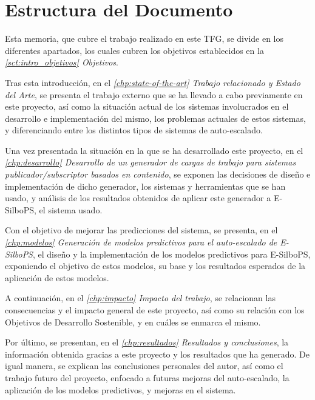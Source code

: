 
\section{Estructura del Documento} \label{sct:intro_estructura}

Esta memoria, que cubre el trabajo realizado en este TFG, se divide en los 
diferentes apartados, los cuales cubren los objetivos establecidos en la 
\textit{\autoref{sct:intro_objetivos} Objetivos}.

Tras esta introducción, en el \textit{\autoref{chp:state-of-the-art} Trabajo relacionado y Estado 
del Arte}, se presenta el trabajo externo que se ha llevado a cabo previamente 
en este proyecto, así como la situación actual de los sistemas involucrados en el 
desarrollo e implementación del mismo, los problemas actuales de estos sistemas, y
diferenciando entre los distintos tipos de sistemas de auto-escalado.

Una vez presentada la situación en la que se ha desarrollado este proyecto, en 
el \textit{\autoref{chp:desarrollo} Desarrollo de un generador de cargas de trabajo para 
sistemas publicador/subscriptor basados en contenido}, se exponen las 
decisiones de diseño e implementación de dicho generador, los sistemas y 
herramientas que se han usado, y análisis de los resultados obtenidos de aplicar 
este generador a E-SilboPS, el sistema usado.

Con el objetivo de mejorar las predicciones del sistema, se presenta, en el
\textit{\autoref{chp:modelos} Generación de  modelos predictivos para el auto-escalado
de E-SilboPS}, el diseño  y la implementación de los modelos predictivos para
E-SilboPS, exponiendo el objetivo de estos modelos, su base y los resultados 
esperados de la aplicación de estos modelos.

A continuación, en el \textit{\autoref{chp:impacto} Impacto del trabajo}, se relacionan
las consecuencias y el impacto general de este proyecto, así como su relación 
con los Objetivos de Desarrollo Sostenible, y en cuáles se enmarca el mismo.

Por último, se presentan, en el \textit{\autoref{chp:resultados} Resultados y conclusiones},
la información obtenida gracias a este proyecto y los resultados que ha generado. 
De igual manera, se explican las conclusiones personales del autor, así como el
trabajo futuro del proyecto, enfocado a futuras mejoras del auto-escalado, la
aplicación de los modelos predictivos, y mejoras en el sistema.

